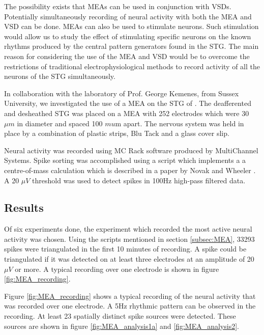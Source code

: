 The possibility exists that \acp{MEA} can be used in conjunction with \acp{VSD}. Potentially simultaneously recording of neural activity with 
both  the \ac{MEA} and \ac{VSD} can be done. \acp{MEA} can also be used to stimulate neurons. Such stimulation would allow us to study the effect of stimulating specific neurons on the known rhythms produced by the central pattern generators found in the \ac{STG}. The main reason for considering the use of the \ac{MEA} and \ac{VSD} would be to overcome the restrictions of traditional electrophysiological methods to record activity of all the neurons of the \ac{STG} simultaneously. 

In collaboration with the laboratory of Prof. George Kemenes, from Sussex University, we investigated the use of a \ac{MEA} on the \ac{STG} of . The deafferented and desheathed \ac{STG} was placed on a \ac{MEA} with 252 electrodes which were 30 $\mu m$ in diameter and spaced 100 $mu$m apart. The nervous system was held in place by a combination of plastic strips, Blu Tack and a glass cover slip.

Neural activity was recorded using MC Rack software produced by MultiChannel Systems. Spike sorting was accomplished using a \matlab script which implements a a centre-of-mass calculation which is described in a paper by Novak and Wheeler \cite{Novak1986}. A 20 $\mu V$ threshold was used to detect spikes in 100Hz high-pass filtered data.

\subsection{Results}
Of six experiments done, the experiment which recorded the most active neural activity was chosen.  Using the  \matlab scripts mentioned in section \ref{subsec:MEA}, 33293 spikes were triangulated in the first 10 minutes of recording. A spike could be triangulated if it was detected on at least three electrodes at an amplitude of 20$\mu V$ or more. A typical recording over one electrode is shown in figure \ref{fig:MEA_recording}.

Figure \ref{fig:MEA_recording} shows a typical recording of the neural activity that was recorded over one electrode. A 5Hz rhythmic pattern can be observed in the recording. At least 23 spatially distinct spike sources were detected. These sources are shown in figure \ref{fig:MEA_analysis1a} and \ref{fig:MEA_analysis2}.

